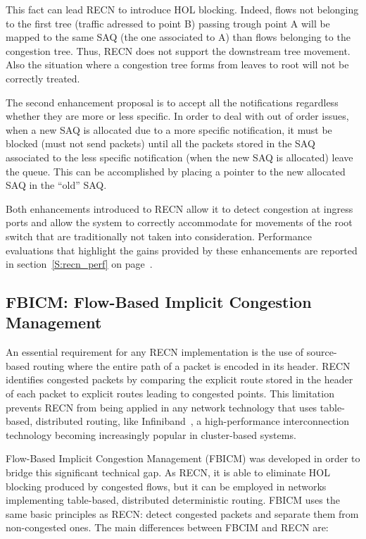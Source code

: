 This fact can lead RECN to introduce HOL blocking. Indeed, flows not belonging to the first tree (traffic adressed to point B) passing trough point A will be mapped to the same SAQ (the one associated to A) than flows belonging to the congestion tree. Thus, RECN does not support the downstream tree movement. Also the situation where a congestion tree forms from leaves to root will not be correctly treated.

The second enhancement proposal is to accept all the notifications regardless whether they are more or less specific. In order to deal with out of order issues, when a new SAQ is allocated due to a more specific notification, it must be blocked (must not send packets) until all the packets stored in the SAQ associated to the less specific notification (when the new SAQ is allocated) leave the queue. This can be accomplished by placing a pointer to the new allocated SAQ in the “old” SAQ.

Both enhancements introduced to RECN allow it to detect congestion at ingress ports and allow the system to correctly accommodate for movements of the root switch that are traditionally not taken into consideration. Performance evaluations that highlight the gains provided by these enhancements are reported in section~\ref{S:recn_perf} on page~\pageref{S:recn_perf}.

\subsection{FBICM: Flow-Based Implicit Congestion Management}\label{S:fbicm}

An essential requirement for any RECN implementation is the use of source-based routing where the entire path of a packet is encoded in its header. RECN identifies congested packets by comparing the explicit route stored in the header of each packet to explicit routes leading to congested points. This limitation prevents RECN from being applied in any network technology that uses table-based, distributed routing, like Infiniband~\cite{infiniband}, a high-performance interconnection technology becoming increasingly popular in cluster-based systems.

Flow-Based Implicit Congestion Management (FBICM) was developed in order to bridge this significant technical gap. As RECN, it is able to eliminate HOL blocking produced by congested flows, but it can be employed in networks implementing table-based, distributed deterministic routing. FBICM uses the same basic principles as RECN: detect congested packets and separate them from non-congested ones. The main differences between FBCIM and RECN are:

